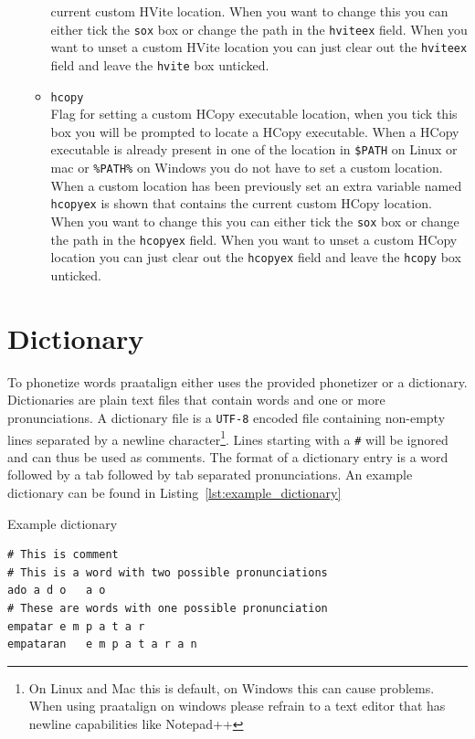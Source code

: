 \documentclass[twoside,a4paper]{book}
\begin{document}
\begin{itemize}
\begin{itemize}
				current custom HVite location.  When you want to change this you can
				either tick the \texttt{sox} box or change the path in the
				\texttt{hviteex} field.  When you want to unset a custom HVite location
				you can just clear out the \texttt{hviteex} field and leave the
				\texttt{hvite} box unticked.
			\item \texttt{hcopy}\\
				Flag for setting a custom HCopy executable location, when you tick this
				box you will be prompted to locate a HCopy executable. When a HCopy
				executable is already present in one of the location in \texttt{\$PATH}
				on Linux or mac or \texttt{\%PATH\%} on Windows you do not have to set
				a custom location. When a custom location has been previously set an
				extra variable named \texttt{hcopyex} is shown that contains the
				current custom HCopy location.  When you want to change this you can
				either tick the \texttt{sox} box or change the path in the
				\texttt{hcopyex} field.  When you want to unset a custom HCopy location
				you can just clear out the \texttt{hcopyex} field and leave the
				\texttt{hcopy} box unticked.
		\end{itemize}
\end{itemize}

\section{Dictionary}
To phonetize words praatalign either uses the provided phonetizer or a
dictionary. Dictionaries are plain text files that contain words and one or
more pronunciations. A dictionary file is a \texttt{UTF-8} encoded file
containing non-empty lines separated by a newline
character\footnote{\label{fn:n1}On Linux and Mac this is default, on Windows
this can cause problems. When using praatalign on windows please refrain to a
text editor that has newline capabilities like Notepad++}. Lines starting with
a \texttt{\#} will be ignored and can thus be used as comments. The format of a
dictionary entry is a word followed by a tab followed by tab separated
pronunciations. An example dictionary can be found in
Listing~\ref{lst:example_dictionary}

\begin{listing}
	\caption{Example dictionary}
	\label{lst:example_dictionary}
	\begin{verbatim}
# This is comment
# This is a word with two possible pronunciations
ado	a d o	a o
# These are words with one possible pronunciation
empatar	e m p a t a r
empataran	e m p a t a r a n
	\end{verbatim}
\end{listing}
	
\end{document}
